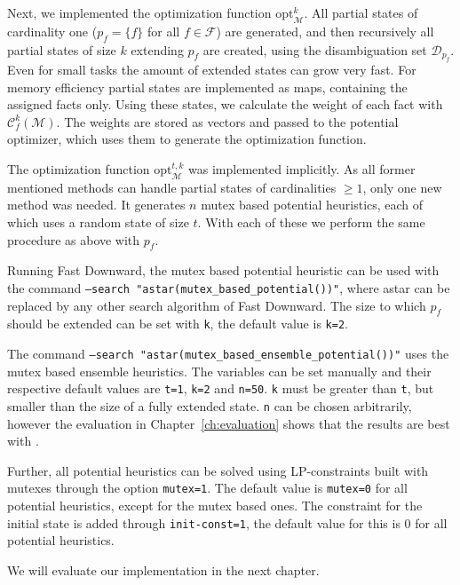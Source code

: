 Next, we implemented the optimization function $\mathrm{opt}^k_\mathcal{M}$.
All partial states of cardinality one ($p_f = \{f\}$ for all $f\in\mathcal{F}$) are generated, and then recursively all partial states of size $k$ extending $p_f$ are created, using the disambiguation set $\mathcal{D}_{p_f}$.
Even for small tasks the amount of extended states can grow very fast.
For memory efficiency partial states are implemented as maps, containing the assigned facts only.
Using these states, we calculate the weight of each fact with $\mathcal{C}_f^k(\mathcal{M})$.
The weights are stored as vectors and passed to the potential optimizer, which uses them to generate the optimization function.

The optimization function $\mathrm{opt}^{t,k}_\mathcal{M}$ was implemented implicitly.
As all former mentioned methods can handle partial states of cardinalities $\geq 1$, only one new method was needed.
It generates $n$ mutex based potential heuristics, each of which uses a random state of size $t$.
With each of these we perform the same procedure as above with $p_f$.

Running Fast Downward, the mutex based potential heuristic can be used with the command \texttt{--search "astar(mutex\_based\_potential())"}, where astar can be replaced by any other search algorithm of Fast Downward.
The size to which $p_f$ should be extended can be set with \texttt{k}, the default value is \texttt{k=2}.

The command \texttt{--search "astar(mutex\_based\_ensemble\_potential())"} uses the mutex based ensemble heuristics.
The variables can be set manually and their respective default values are \texttt{t=1}, \texttt{k=2} and \texttt{n=50}.
\texttt{k} must be greater than \texttt{t}, but smaller than the size of a fully extended state.
\texttt{n} can be chosen arbitrarily, however the evaluation in Chapter~\ref{ch:evaluation} shows that the results are best with .

Further, all potential heuristics can be solved using LP-constraints built with mutexes through the option \texttt{mutex=1}.
The default value is \texttt{mutex=0} for all potential heuristics, except for the mutex based ones.
The constraint for the initial state is added through \texttt{init-const=1}, the default value for this is $0$ for all potential heuristics.

We will evaluate our implementation in the next chapter.
